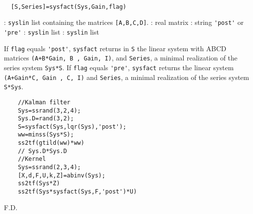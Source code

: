\begin{mandesc}
   \\ %
\end{mandesc}
\begin{calling_sequence}
\begin{verbatim}
  [S,Series]=sysfact(Sys,Gain,flag)  
\end{verbatim}
\end{calling_sequence}
\begin{parameters}
  \begin{varlist}
    : \verb!syslin! list containing the matrices \verb![A,B,C,D]!.
    : real matrix
    : string \verb!'post'! or \verb!'pre'!
    : \verb!syslin! list
    : \verb!syslin! list
  \end{varlist}
\end{parameters}
\begin{mandescription}
  If \verb!flag! equals \verb!'post'!, \verb!sysfact! returns in \verb!S! the linear 
  system with ABCD matrices \verb!(A+B*Gain, B , Gain, I)!, and   \verb!Series!, 
  a minimal realization of the series system \verb!Sys*S!.
  If \verb!flag! equals \verb!'pre'!,  \verb!sysfact! returns  the linear system
  \verb!(A+Gain*C, Gain , C, I)! and \verb!Series!, a minimal realization of the 
  series system \verb!S*Sys!.
\end{mandescription}
\begin{examples}
  \begin{Verbatim}
    //Kalman filter
    Sys=ssrand(3,2,4);
    Sys.D=rand(3,2);
    S=sysfact(Sys,lqr(Sys),'post');
    ww=minss(Sys*S);
    ss2tf(gtild(ww)*ww)
    // Sys.D*Sys.D
    //Kernel
    Sys=ssrand(2,3,4);
    [X,d,F,U,k,Z]=abinv(Sys);
    ss2tf(Sys*Z)
    ss2tf(Sys*sysfact(Sys,F,'post')*U)
  \end{Verbatim}
\end{examples}
\begin{manseealso}
     
\end{manseealso}
\begin{authors}
  F.D.  
\end{authors}
